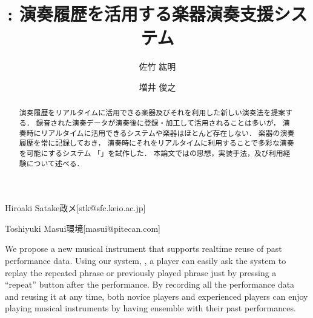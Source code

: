 \documentclass[submit,techreq]{ec2017}
\begin{document}
\title{{\system}: 演奏履歴を活用する楽器演奏支援システム}



\author{佐竹 紘明}{Hiroaki Satake}{政メ}[stk@sfc.keio.ac.jp]
\author{増井 俊之}{Toshiyuki Masui}{環境}[masui@pitecan.com]

\begin{abstract} %

演奏履歴をリアルタイムに活用できる楽器及びそれを利用した新しい演奏法を提案する．
%
録音された演奏データが演奏後に登録・加工して活用されることは多いが，
演奏時にリアルタイムに活用できるシステムや楽器はほとんど存在しない．
%
楽器の演奏履歴を常に記録しておき，
演奏時にそれをリアルタイムに利用することで多彩な演奏を可能にするシステム
「{\system}」を試作した．
%
本論文では{\system}の思想，実装手法，及び利用経験について述べる．

\end{abstract}


\begin{eabstract}

We propose a new musical instrument that supports realtime reuse of
past performance data.
%
Using our system, \textit{\system},
a player can easily ask the system to replay the repeated phrase or
previously played phrase just by pressing a ``repeat'' button after the performance.
%
By recording all the performance data and reusing it at any time,
both novice players and experienced players can enjoy playing musical instruments
by having ensemble with their past performances.

\end{eabstract}


\maketitle










\end{document}
